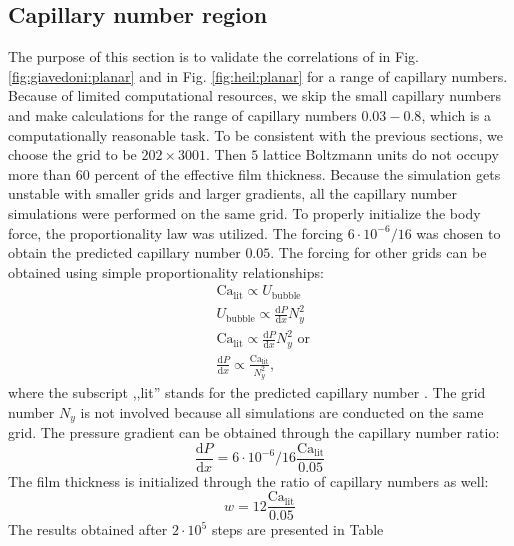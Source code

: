 \documentclass[preprint,12pt]{elsarticle}
\newcommand{\Ca}{\mathrm{Ca}}
\begin{document}
\subsection{Capillary number region}
The purpose of this section is to validate the correlations of
\citet{giavedoni-numerical} in Fig. \ref{fig:giavedoni:planar} and
\citet{heil-bretherton} in Fig. \ref{fig:heil:planar} for a range of capillary
numbers. Because of limited computational resources, we skip the
small capillary numbers and make calculations for the range of capillary numbers $0.03-0.8$, which
is a computationally reasonable task.  To be consistent with the previous sections, we choose the grid to be
$202 \times 3001$. Then $5$ lattice Boltzmann units do not occupy more than $60$
percent of the effective film thickness. Because the simulation gets unstable with
smaller grids and larger gradients, all the capillary number simulations were
performed on the same grid. To properly initialize the body force, the
proportionality law was utilized. The forcing
$6 \cdot 10^{-6}/16$ was chosen to obtain the predicted capillary
number $0.05$. The forcing for other grids can be obtained using
simple proportionality relationships:
\begin{equation}
\begin{aligned}
&\Ca_{\mathrm{lit}} \propto U_{\mathrm{bubble}}\\
&U_{\mathrm{bubble}} \propto \frac{\mathrm{d}P}{\mathrm{d}x} N_y^2\\
&\Ca_{\mathrm{lit}} \propto \frac{\mathrm{d}P}{\mathrm{d} x} N_y^2 \text{ or }\\
&\frac{\mathrm{d}P}{\mathrm{d} x} \propto \frac{\Ca_{\mathrm{lit}}}{N_y^2},
\end{aligned}
\end{equation}
where the subscript ,,lit'' stands for the predicted capillary number
\cite{giavedoni-numerical,heil-bretherton}. The grid number $N_y$ is not
involved because all simulations are conducted on the same grid.
The pressure gradient can be obtained through the capillary number
ratio:
\begin{equation}
\frac{\mathrm{d}P}{\mathrm{d} x}=6 \cdot 10^{-6}/16 \frac{\Ca_{\mathrm{lit}}}{0.05}
\end{equation}
The film thickness is initialized through the ratio of capillary numbers as well:
\begin{equation*}
w=12 \frac{\Ca_{\mathrm{lit}}}{0.05}
\end{equation*}
The results obtained after $2\cdot10^5$ steps are presented in Table
\end{document}
